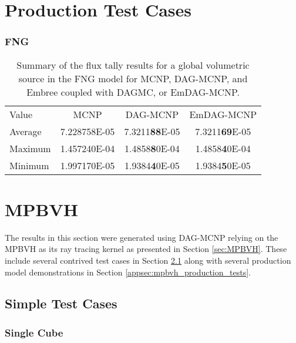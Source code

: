   \section{Production Test Cases}\label{appsec:emdag_fng}
  
  \subsubsection{FNG}

  \begin{table}[H]
    \small
    \begin{center}
      \begin{tabular}{lccc}
        \toprule
        Value & MCNP & DAG-MCNP & EmDAG-MCNP \\
        Average & 7.228758E-05 & 7.3211\textbf{88}E-05 & 7.3211\textbf{69}E-05 \\
        Maximum & 1.457240E-04 & 1.4858\textbf{8}0E-04 & 1.4858\textbf{4}0E-04 \\
        Minimum & 1.997170E-05 & 1.9384\textbf{4}0E-05 & 1.9384\textbf{5}0E-05 \\
      \end{tabular}
    \end{center}
    \caption[Flux tally results in FNG for various DAG-MCNP
      implementations.]{Summary of the flux tally results for a global
      volumetric source in the FNG model for MCNP, DAG-MCNP, and Embree coupled
      with DAGMC, or EmDAG-MCNP.}
  \end{table}

  \section{MPBVH}

  The results in this section were generated using DAG-MCNP relying on the MPBVH
  as its ray tracing kernel as presented in Section \ref{sec:MPBVH}. These
  include several contrived test cases in Section
  \ref{appsec:mpbvh_simple_tests} along with several production model
  demonstrations in Section \ref{appsec:mpbvh_production_tests}.

\subsection{Simple Test Cases}\label{appsec:mpbvh_simple_tests}

  \subsubsection{Single Cube}

